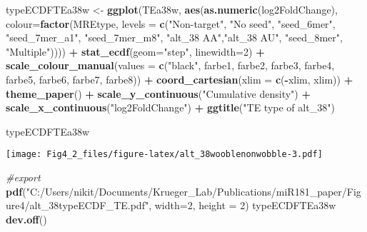 \documentclass[
]{article}
\newenvironment{Shaded}{\begin{snugshade}}{\end{snugshade}}
\newcommand{\AttributeTok}[1]{\textcolor[rgb]{0.13,0.29,0.53}{#1}}
\newcommand{\CommentTok}[1]{\textcolor[rgb]{0.56,0.35,0.01}{\textit{#1}}}
\newcommand{\DecValTok}[1]{\textcolor[rgb]{0.00,0.00,0.81}{#1}}
\newcommand{\FunctionTok}[1]{\textcolor[rgb]{0.13,0.29,0.53}{\textbf{#1}}}
\newcommand{\NormalTok}[1]{#1}
\newcommand{\OtherTok}[1]{\textcolor[rgb]{0.56,0.35,0.01}{#1}}
\newcommand{\SpecialCharTok}[1]{\textcolor[rgb]{0.81,0.36,0.00}{\textbf{#1}}}
\newcommand{\StringTok}[1]{\textcolor[rgb]{0.31,0.60,0.02}{#1}}
\begin{document}
\begin{Shaded}
\begin{Highlighting}[]
\NormalTok{typeECDFTEa38w }\OtherTok{\textless{}{-}} \FunctionTok{ggplot}\NormalTok{(TEa38w, }\FunctionTok{aes}\NormalTok{(}\FunctionTok{as.numeric}\NormalTok{(log2FoldChange), }
                              \AttributeTok{colour=}\FunctionTok{factor}\NormalTok{(MREtype, }\AttributeTok{levels =} \FunctionTok{c}\NormalTok{(}\StringTok{"Non{-}target"}\NormalTok{, }\StringTok{"No seed"}\NormalTok{, }\StringTok{"seed\_6mer"}\NormalTok{, }\StringTok{"seed\_7mer\_a1"}\NormalTok{, }\StringTok{"seed\_7mer\_m8"}\NormalTok{, }\StringTok{"alt\_38 AA"}\NormalTok{,}\StringTok{"alt\_38 AU"}\NormalTok{, }\StringTok{"seed\_8mer"}\NormalTok{, }\StringTok{"Multiple"}\NormalTok{)))) }\SpecialCharTok{+} 
  \FunctionTok{stat\_ecdf}\NormalTok{(}\AttributeTok{geom=}\StringTok{"step"}\NormalTok{, }\AttributeTok{linewidth=}\DecValTok{2}\NormalTok{) }\SpecialCharTok{+}
  \FunctionTok{scale\_colour\_manual}\NormalTok{(}\AttributeTok{values =} \FunctionTok{c}\NormalTok{(}\StringTok{"black"}\NormalTok{, farbe1, farbe2, farbe3, farbe4, farbe5, farbe6, farbe7, farbe8)) }\SpecialCharTok{+}
  \FunctionTok{coord\_cartesian}\NormalTok{(}\AttributeTok{xlim =} \FunctionTok{c}\NormalTok{(}\SpecialCharTok{{-}}\NormalTok{xlim, xlim)) }\SpecialCharTok{+} 
  \FunctionTok{theme\_paper}\NormalTok{() }\SpecialCharTok{+}
  \FunctionTok{scale\_y\_continuous}\NormalTok{(}\StringTok{"Cumulative density"}\NormalTok{) }\SpecialCharTok{+} \FunctionTok{scale\_x\_continuous}\NormalTok{(}\StringTok{"log2FoldChange"}\NormalTok{) }\SpecialCharTok{+}
  \FunctionTok{ggtitle}\NormalTok{(}\StringTok{"TE type of alt\_38"}\NormalTok{)}

\NormalTok{typeECDFTEa38w}
\end{Highlighting}
\end{Shaded}

\texttt{[image: Fig4\_2\_files/figure-latex/alt\_38wooblenonwobble-3.pdf]}

\begin{Shaded}
\begin{Highlighting}[]
\CommentTok{\#export}
\FunctionTok{pdf}\NormalTok{(}\StringTok{"C:/Users/nikit/Documents/Krueger\_Lab/Publications/miR181\_paper/Figure4/alt\_38typeECDF\_TE.pdf"}\NormalTok{, }\AttributeTok{width=}\DecValTok{2}\NormalTok{, }\AttributeTok{height =} \DecValTok{2}\NormalTok{)}
\NormalTok{typeECDFTEa38w}
\FunctionTok{dev.off}\NormalTok{()}
\end{Highlighting}
\end{Shaded}
\end{document}
